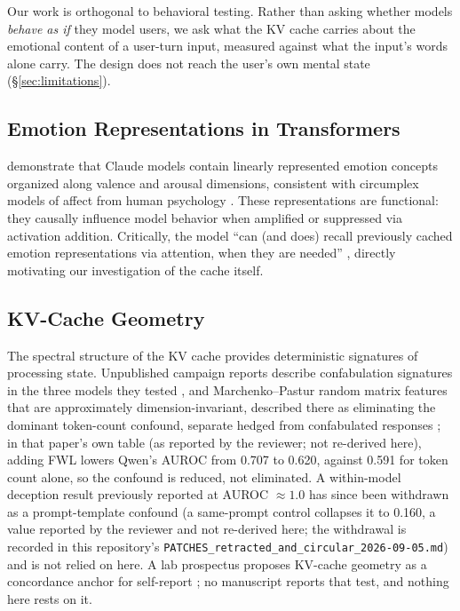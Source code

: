 \documentclass[11pt,a4paper]{article}
\begin{document}
Our work is orthogonal to behavioral testing. Rather than asking whether models \emph{behave as if} they model users, we ask what the KV cache carries about the emotional content of a user-turn input, measured against what the input's words alone carry. The design does not reach the user's own mental state (\S\ref{sec:limitations}).

\subsection{Emotion Representations in Transformers}

\citet{anthropic2026emotions} demonstrate that Claude models contain linearly represented emotion concepts organized along valence and arousal dimensions, consistent with circumplex models of affect from human psychology \citep{russell1980circumplex}. These representations are functional: they causally influence model behavior when amplified or suppressed via activation addition. Critically, the model ``can (and does) recall previously cached emotion representations via attention, when they are needed'' \citep{anthropic2026emotions}, directly motivating our investigation of the cache itself.

\subsection{KV-Cache Geometry}

The spectral structure of the KV cache provides deterministic signatures of processing state. Unpublished campaign reports describe confabulation signatures in the three models they tested \citep{lyra2026detecting}, and Marchenko--Pastur random matrix features that are approximately dimension-invariant, described there as eliminating the dominant token-count confound, separate hedged from confabulated responses \citep{lyra2026oracle}; in that paper's own table (as reported by the reviewer; not re-derived here), adding FWL lowers Qwen's AUROC from 0.707 to 0.620, against 0.591 for token count alone, so the confound is reduced, not eliminated. A within-model deception result previously reported at AUROC $\approx 1.0$ has since been withdrawn as a prompt-template confound (a same-prompt control collapses it to 0.160, a value reported by the reviewer and not re-derived here; the withdrawal is recorded in this repository's \texttt{PATCHES\_retracted\_and\_circular\_2026-09-05.md}) and is not relied on here. A lab prospectus proposes KV-cache geometry as a concordance anchor for self-report \citep{lyra2026concordance}; no manuscript reports that test, and nothing here rests on it.
\end{document}
